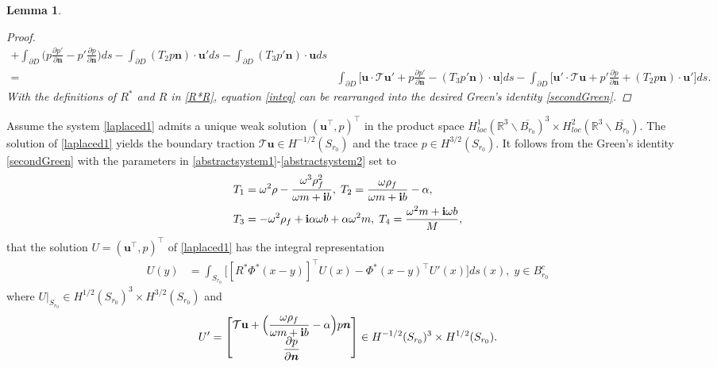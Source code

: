 \documentclass[11pt]{article}
\newcommand{\mat}{\mathbb}
\newcommand{\R}{{\mat R}}
\newcommand{\ds}{\displaystyle}
\newcommand{\ba}{\backslash}
\newcommand{\pa}{\partial}
\newcommand{\bs}{\boldsymbol}
\newtheorem{lemma}[theorem]{Lemma}
\begin{document}
\begin{lemma}
\begin{proof}
\begin{align}
+\int_{\pa D}\Big(p\frac{ \pa p'}{\pa \bs{n}}-p'\frac{ \pa p}{\pa \bs{n}}\Big)ds-\int_{\pa D}
(T_2 p\bs{n})\cdot\mathbf{u}'ds-\int_{\pa D}(T_3p'\bs{n})\cdot\mathbf{u}ds\\ \label{inteq}
=&\int_{\pa D} \Big[\mathbf{u}\cdot\mathcal{T}\mathbf{u}'+p\frac{ \pa p'}{\pa \bs{n}}-(T_3p'\bs{n})
\cdot\mathbf{u}\Big]ds-\int_{\pa D}\Big[\mathbf{u}'\cdot\mathcal{T}\mathbf{u}+p'\frac{ \pa p}{\pa\bs{n} }
+(T_2 p\bs{n})\cdot\mathbf{u}'\Big]ds. 
\end{align}
With the definitions of $R^*$ and $R$ in \eqref{R*R}, equation \eqref{inteq} can be rearranged 
into the desired Green's identity \eqref{secondGreen}.	
\end{proof}
\end{lemma}
Assume the system \eqref{laplaced1} admits a unique weak solution $(\mathbf{u}^{\top},p)^{\top}$ in 
the product space $H_{loc}^1(\R^3\ba\overline{B_{r_0}})^3\times H_{loc}^2(\R^3\ba\overline{B_{r_0}})$. 
The solution of \eqref{laplaced1} yields the boundary traction  $\mathcal{T}\mathbf{u}\in { H^{-1/2}( S_{r_0})}$
and the trace $p\in { H^{3/2}( S_{r_0})}$.
It follows from the Green’s identity \eqref{secondGreen} with the parameters in 
\eqref{abstractsystem1}-\eqref{abstractsystem2} set to
\begin{equation}\label{T1234}
\begin{aligned} 
&T_1=\omega^2 \rho -\frac{\omega^3 \rho_f^2}{{\omega m+\bf{i}}b},\;
T_2=\frac{\omega\rho_f}{{\omega m+\bf{i}}b}-\alpha,\\
&T_3=-\omega^2\rho_f+{\bf{i}}\alpha\omega b+\alpha\omega^2m,\;
T_4=\frac{\omega^2m+{\bf{i}}\omega b}{M},
\end{aligned}
\end{equation}
that the solution $U=(\mathbf{u}^{\top},p)^{\top}$ of \eqref{laplaced1} has the integral representation
\begin{equation}\label{integrationrlaplaced}
\begin{aligned}
U(y)&=\int_{S_{r_0}}\Big[[R^*{\Phi}^*(x-y)]^{\top}U(x)-{\Phi}^*(x-y)^{\top}U'(x)\Big]ds(x),\;y\in B_{r_0}^c
\end{aligned}
\end{equation}
where $U|_{S_{r_0}}\in H^{1/2}(S_{r_0})^3\times H^{3/2}(S_{r_0})$ and
\begin{align*}
U'=\begin{bmatrix}
\mathcal{T}\mathbf{u}+\Big(\ds\frac{\omega\rho_f}{{\omega m+\bf{i}}b}-\alpha\Big)p\bs{n}  \\
\ds\frac{\pa p }{\pa \bs{n}} \\
\end{bmatrix}\in H^{-1/2}(S_{r_0})^3\times H^{1/2}(S_{r_0}).
\end{align*}
\end{document}
